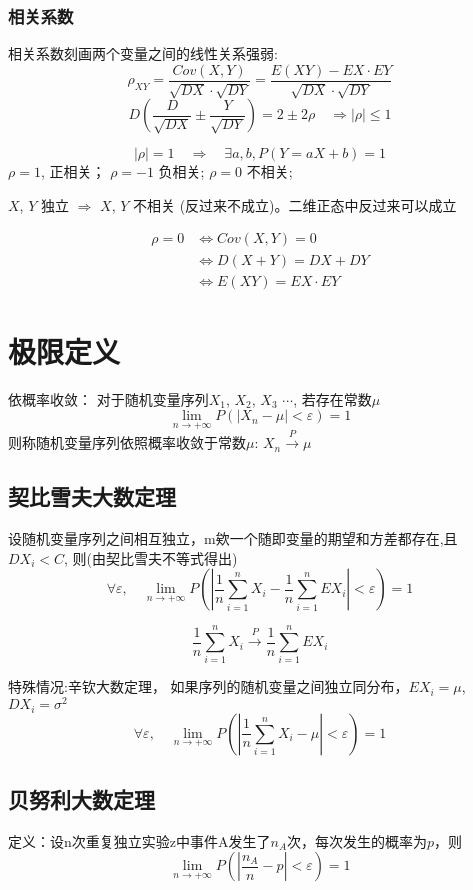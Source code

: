 \documentclass[10pt, a4paper]{article}
\begin{document}
    \subsubsection{相关系数}
        相关系数刻画两个变量之间的线性关系强弱:
        $$\rho_{XY} = \frac{Cov(X, Y)}{\sqrt{DX}\cdot\sqrt{DY}} = \frac{E(XY) - EX\cdot EY}{\sqrt{DX}\cdot\sqrt{DY}}$$ 
        $$D(\frac{D}{\sqrt{DX}} \pm \frac{Y}{\sqrt{DY}}) = 2 \pm 2\rho \quad \Rightarrow |\rho| \leqslant 1$$

        $$|\rho| = 1 \quad \Rightarrow \quad \exists a, b, P(Y = aX + b) = 1$$
        $\rho = 1$, 正相关； $\rho = -1$ 负相关; $\rho = 0$ 不相关;
        
        $X$, $Y$ 独立 $\Rightarrow$ $X$, $Y$ 不相关 (反过来不成立)。二维正态中反过来可以成立

        \begin{align*}
            \rho = 0 &\Leftrightarrow Cov(X, Y) = 0\\ 
                    &\Leftrightarrow D(X + Y) = DX + DY \\
                    &\Leftrightarrow E(XY) = EX\cdot EY
        \end{align*}

        \newpage
\section{极限定义}
    依概率收敛： 对于随机变量序列$X_1$, $X_2$, $X_3$ $\cdots$, 若存在常数$\mu$
    $$\lim_{n\rightarrow+\infty}P(|X_n - \mu| < \varepsilon) = 1$$
    则称随机变量序列依照概率收敛于常数$\mu$: $X_n \xrightarrow {P} \mu$

    \subsection{契比雪夫大数定理}
    设随机变量序列之间相互独立，m欸一个随即变量的期望和方差都存在,且 $DX_i < C$, 则(由契比雪夫不等式得出)
    $$\forall \varepsilon, \quad \lim_{n\rightarrow+\infty}P(|\frac{1}{n}\sum_{i = 1}^nX_i - \frac{1}{n}\sum_{i = 1}^nEX_i| < \varepsilon) = 1$$

    $$\frac{1}{n}\sum_{i = 1}^n X_i \xrightarrow {P} \frac{1}{n}\sum_{i = 1}^nEX_i$$

    特殊情况:辛钦大数定理， 如果序列的随机变量之间独立同分布，$EX_i = \mu$, $DX_i = \sigma^2$
    $$\forall \varepsilon, \quad \lim_{n\rightarrow+\infty}P(|\frac{1}{n}\sum_{i = 1}^nX_i - \mu| < \varepsilon) = 1$$
        
    \subsection{贝努利大数定理}
    定义：设n次重复独立实验z中事件A发生了$n_A$次，每次发生的概率为$p$，则
    $$\lim_{n\rightarrow+\infty}P(|\frac{n_A}{n} - p| < \varepsilon) = 1$$
\end{document}
